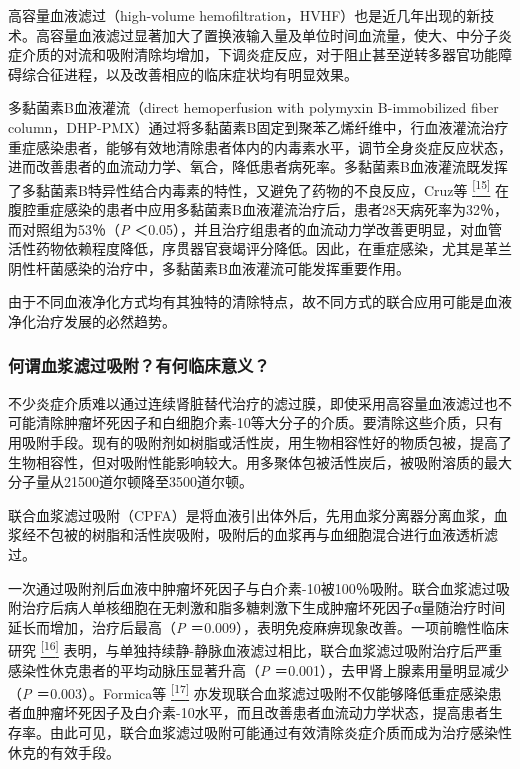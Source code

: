 高容量血液滤过（high-volume
hemofiltration，HVHF）也是近几年出现的新技术。高容量血液滤过显著加大了置换液输入量及单位时间血流量，使大、中分子炎症介质的对流和吸附清除均增加，下调炎症反应，对于阻止甚至逆转多器官功能障碍综合征进程，以及改善相应的临床症状均有明显效果。

多黏菌素B血液灌流（direct hemoperfusion with polymyxin B-immobilized
fiber
column，DHP-PMX）通过将多黏菌素B固定到聚苯乙烯纤维中，行血液灌流治疗重症感染患者，能够有效地清除患者体内的内毒素水平，调节全身炎症反应状态，进而改善患者的血流动力学、氧合，降低患者病死率。多黏菌素B血液灌流既发挥了多黏菌素B特异性结合内毒素的特性，又避免了药物的不良反应，Cruz等
\protect\hyperlink{text00018.htmlux5cux23ch15-17}{\textsuperscript{{[}15{]}}}
在腹腔重症感染的患者中应用多黏菌素B血液灌流治疗后，患者28天病死率为32％，而对照组为53％（\emph{P}
＜0.05），并且治疗组患者的血流动力学改善更明显，对血管活性药物依赖程度降低，序贯器官衰竭评分降低。因此，在重症感染，尤其是革兰阴性杆菌感染的治疗中，多黏菌素B血液灌流可能发挥重要作用。

由于不同血液净化方式均有其独特的清除特点，故不同方式的联合应用可能是血液净化治疗发展的必然趋势。

\subsubsection{何谓血浆滤过吸附？有何临床意义？}

不少炎症介质难以通过连续肾脏替代治疗的滤过膜，即使采用高容量血液滤过也不可能清除肿瘤坏死因子和白细胞介素-10等大分子的介质。要清除这些介质，只有用吸附手段。现有的吸附剂如树脂或活性炭，用生物相容性好的物质包被，提高了生物相容性，但对吸附性能影响较大。用多聚体包被活性炭后，被吸附溶质的最大分子量从21500道尔顿降至3500道尔顿。

联合血浆滤过吸附（CPFA）是将血液引出体外后，先用血浆分离器分离血浆，血浆经不包被的树脂和活性炭吸附，吸附后的血浆再与血细胞混合进行血液透析滤过。

一次通过吸附剂后血液中肿瘤坏死因子与白介素-10被100％吸附。联合血浆滤过吸附治疗后病人单核细胞在无刺激和脂多糖刺激下生成肿瘤坏死因子α量随治疗时间延长而增加，治疗后最高（\emph{P}
＝0.009），表明免疫麻痹现象改善。一项前瞻性临床研究
\protect\hyperlink{text00018.htmlux5cux23ch16-17}{\textsuperscript{{[}16{]}}}
表明，与单独持续静-静脉血液滤过相比，联合血浆滤过吸附治疗后严重感染性休克患者的平均动脉压显著升高（\emph{P}
＝0.001），去甲肾上腺素用量明显减少（\emph{P} ＝0.003）。Formica等
\protect\hyperlink{text00018.htmlux5cux23ch17-17}{\textsuperscript{{[}17{]}}}
亦发现联合血浆滤过吸附不仅能够降低重症感染患者血肿瘤坏死因子及白介素-10水平，而且改善患者血流动力学状态，提高患者生存率。由此可见，联合血浆滤过吸附可能通过有效清除炎症介质而成为治疗感染性休克的有效手段。

